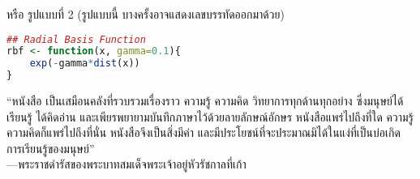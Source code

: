 \vspace{0.5cm}
%
หรือ รูปแบบที่ 2 (รูปแบบนี้ บางครั้งอาจแสดงเลขบรรทัดออกมาด้วย)
\begin{lstlisting}[language=R, numbers=none]
## Radial Basis Function
rbf <- function(x, gamma=0.1){
	exp(-gamma*dist(x))
}
\end{lstlisting}


%

\pagebreak

\begin{shaded}


``หนังสือ เป็นเสมือนคลังที่รวบรวมเรื่องราว ความรู้ ความคิด วิทยาการทุกด้านทุกอย่าง ซึ่งมนุษย์ได้เรียนรู้ ได้คิดอ่าน และเพียรพยายามบันทึกภาษาไว้ด้วยลายลักษณ์อักษร หนังสือแพร่ไปถึงที่ใด ความรู้ความคิดก็แพร่ไปถึงที่นั่น หนังสือจึงเป็นสิ่งมีค่า และมีประโยชน์ที่จะประมาณมิได้ในแง่ที่เป็นบ่อเกิดการเรียนรู้ของมนุษย์'' \\
---พระราชดำรัสของพระบาทสมเด็จพระเจ้าอยู่หัวรัชกาลที่เก้า
\end{shaded}

\vspace{-0.5in}
